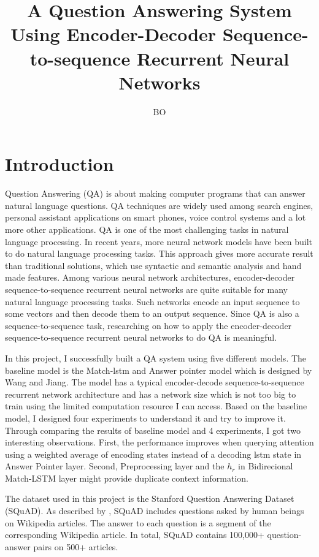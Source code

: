 \documentclass[modernstyle,12pt]{sjsuthesis}
\title{A Question Answering System Using Encoder-Decoder Sequence-to-sequence Recurrent Neural Networks}
\author{BO}{LI}
\theoremstyle{definition}
\begin{document}
\raggedright          %
\parindent=30pt       %




\chapter{Introduction}

Question Answering (QA) is about making computer programs that can answer natural language questions. QA techniques are widely used among search engines, personal assistant applications on smart phones, voice control systems and a lot more other applications. QA is one of the most challenging tasks in natural language processing. In recent years, more neural network models have been built to do natural language processing tasks. This approach gives more accurate result than traditional solutions, which use syntactic and semantic analysis and hand made features. Among various neural network architectures, encoder-decoder sequence-to-sequence recurrent neural networks are quite suitable for many natural language processing tasks. Such networks encode an input sequence to some vectors and then decode them to an output sequence. Since QA is also a sequence-to-sequence task, researching on how to apply the encoder-decoder sequence-to-sequence recurrent neural networks to do QA is meaningful.


In this project, I successfully built a QA system using five different models. The baseline model is the Match-lstm and Answer pointer model which is designed by Wang and Jiang\cite{wang2016machine}. The model has a typical encoder-decode sequence-to-sequence recurrent network architecture and has a network size which is not too big to train using the limited computation resource I can access. Based on the baseline model, I designed four experiments to understand it and try to improve it. Through comparing the results of baseline model and 4 experiments, I got two interesting observations. First, the performance improves when querying attention using a weighted average of encoding states instead of a decoding lstm state in Answer Pointer layer. Second, Preprocessing layer and the $h_r$ in Bidirecional Match-LSTM layer might provide duplicate context information.


The dataset used in this project is the Stanford Question Answering Dataset (SQuAD). As described by \cite{rajpurkar2016squad}, SQuAD includes questions asked by human beings on Wikipedia articles. The answer to each question is a segment of the corresponding Wikipedia article. In total, SQuAD contains 100,000+ question-answer pairs on 500+ articles.
\end{document}

